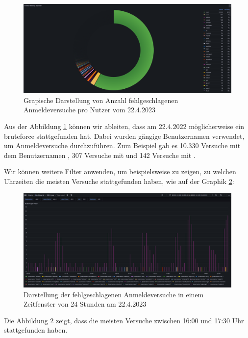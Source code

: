 \newpage
{}
\thispagestyle{lscape}
\begin{landscape}
    \begin{figure}[H]
        \centerline{\includegraphics[width=1.7\textwidth]{assets/Failed_pro_user.png}}
        \caption[Grapische Darstellung von Anzahl fehlgeschlagenen Anmeldeversuche pro Nutzer vom 22.4.2023]
        {Grapische Darstellung von Anzahl fehlgeschlagenen Anmeldeversuche pro Nutzer vom 22.4.2023}
        \label{fig:1_Anmeldung_BenutzerName}
        \centering
    \end{figure}
Aus der Abbildung \ref{fig:1_Anmeldung_BenutzerName} können wir ableiten, dass am 22.4.2022 möglicherweise ein \gls{bruteforce} stattgefunden hat. Dabei wurden gängige Benutzernamen verwendet, um Anmeldeversuche durchzuführen. Zum Beispiel gab es 10.330 Versuche mit dem Benutzernamen , 307 Versuche mit  und 142 Versuche mit .
\end{landscape}
\restoregeometry

\newpage
{}
\thispagestyle{lscape}
\begin{landscape}
  Wir können weitere Filter anwenden, um beispielsweise zu zeigen, zu welchen Uhrzeiten die meisten Versuche stattgefunden haben, wie auf der Graphik \ref{fig:2_Anmeldung_BenutzerName}:
    \begin{figure}[H]
        \centerline{\includegraphics[width=1.6\textwidth]{assets/activityperhour.png}}
        \caption[Darstellung der fehlgeschlagenen Anmeldeversuche in einem Zeitfenster von 24 Stunden am 22.4.2023]
        {Darstellung der fehlgeschlagenen Anmeldeversuche in einem Zeitfenster von 24 Stunden am 22.4.2023}
        \label{fig:2_Anmeldung_BenutzerName}
        \centering
    \end{figure}
  Die Abbildung \ref{fig:2_Anmeldung_BenutzerName} zeigt, dass die meisten Versuche zwischen 16:00 und 17:30 Uhr stattgefunden haben.
\end{landscape}
\restoregeometry

